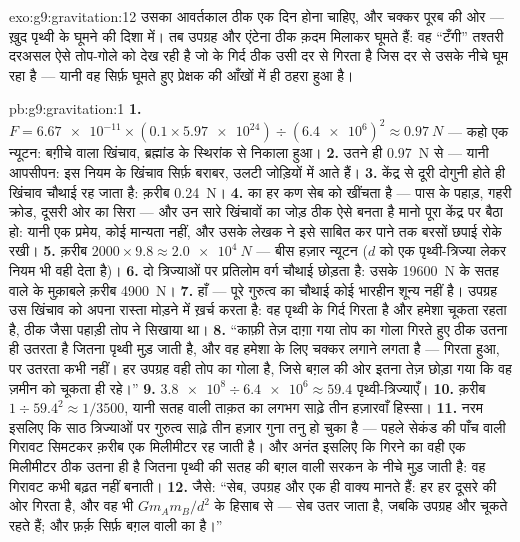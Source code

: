 \begin{solution}{exo:g9:gravitation:12}
उसका आवर्तकाल ठीक एक दिन होना चाहिए, और चक्कर पूरब की ओर ---
ख़ुद पृथ्वी के घूमने की दिशा में। तब उपग्रह और एंटेना ठीक क़दम मिलाकर
घूमते हैं: वह ``टँगी'' तश्तरी दरअसल ऐसे तोप-गोले को देख रही है जो 
के गिर्द ठीक उसी दर से गिरता है जिस दर से  उसके नीचे घूम रहा है
--- यानी वह सिर्फ़ घूमते हुए प्रेक्षक की आँखों में ही ठहरा हुआ है।
\end{solution}

\begin{solution}{pb:g9:gravitation:1}
\textbf{1.} $F = \num{6.67e-11} \times (0.1 \times \num{5.97e24})
\div (\num{6.4e6})^2 \approx \qty{0.97}{N}$ --- कहो एक न्यूटन:
बग़ीचे वाला खिंचाव, ब्रह्मांड के स्थिरांक से निकाला हुआ।
\textbf{2.} उतने ही \qty{0.97}{N} से --- यानी आपसीपन: इस नियम के
खिंचाव सिर्फ़ बराबर, उलटी जोड़ियों में आते हैं।
\textbf{3.} केंद्र से दूरी दोगुनी होते ही खिंचाव चौथाई रह जाता है:
क़रीब \qty{0.24}{N}।
\textbf{4.}  का हर कण सेब को खींचता है --- पास के पहाड़, गहरी
क्रोड, दूसरी ओर का सिरा --- और उन सारे खिंचावों का जोड़ ठीक ऐसे बनता
है मानो पूरा  केंद्र पर बैठा हो: यानी एक प्रमेय, कोई मान्यता
नहीं, और उसके लेखक ने इसे साबित कर पाने तक बरसों छपाई रोके रखी।
\textbf{5.} क़रीब $2000 \times 9.8 \approx \qty{2.0e4}{N}$ ---
बीस हज़ार न्यूटन ($d$ को एक पृथ्वी-त्रिज्या लेकर नियम भी वही देता
है)।
\textbf{6.} दो त्रिज्याओं पर प्रतिलोम वर्ग चौथाई छोड़ता है: उसके
\qty{19600}{N} के सतह वाले  के मुक़ाबले क़रीब \qty{4900}{N}।
\textbf{7.} हाँ --- पूरे गुरुत्व का चौथाई कोई भारहीन शून्य नहीं है।
उपग्रह उस खिंचाव को अपना रास्ता मोड़ने में ख़र्च करता है: वह पृथ्वी के
गिर्द गिरता है और हमेशा चूकता रहता है, ठीक जैसा पहाड़ी तोप ने सिखाया
था।
\textbf{8.} ``काफ़ी तेज़ दाग़ा गया तोप का गोला गिरते हुए ठीक उतना ही
उतरता है जितना पृथ्वी मुड़ जाती है, और वह हमेशा के लिए चक्कर लगाने
लगता है --- गिरता हुआ, पर उतरता कभी नहीं। हर उपग्रह वही तोप का गोला
है, जिसे बग़ल की ओर इतना तेज़ छोड़ा गया कि वह ज़मीन को चूकता ही रहे।''
\textbf{9.} $\num{3.8e8} \div \num{6.4e6} \approx 59.4$
पृथ्वी-त्रिज्याएँ।
\textbf{10.} क़रीब $1 \div 59.4^2 \approx 1/3500$, यानी सतह वाली
ताक़त का लगभग साढ़े तीन हज़ारवाँ हिस्सा।
\textbf{11.} नरम इसलिए कि साठ त्रिज्याओं पर गुरुत्व साढ़े तीन हज़ार
गुना तनु हो चुका है --- पहले सेकंड की पाँच  वाली गिरावट सिमटकर
क़रीब एक मिलीमीटर रह जाती है। और अनंत इसलिए कि गिरने का वही एक
मिलीमीटर ठीक उतना ही है जितना पृथ्वी की सतह  की बग़ल वाली
सरकन के नीचे मुड़ जाती है: वह गिरावट कभी बढ़त नहीं बनाती।
\textbf{12.} जैसे: ``सेब, उपग्रह और  एक ही वाक्य मानते हैं:
हर  हर दूसरे  की ओर गिरता है, और वह भी
$G m_A m_B / d^2$ के हिसाब से --- सेब उतर जाता है, जबकि उपग्रह और
 चूकते रहते हैं; और फ़र्क़ सिर्फ़ बग़ल वाली  का है।''
\end{solution}
